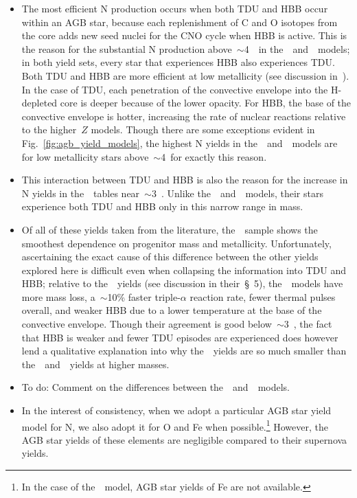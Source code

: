 \documentclass[ms.tex]{subfiles}
\begin{document}
\begin{itemize}
	\item The most efficient N production occurs when both TDU and HBB 
	occur within an AGB star, because each replenishment of C and O 
	isotopes from the core adds new seed nuclei for the CNO cycle when HBB 
	is active. 
	This is the reason for the substantial N production 
	above~$\sim$4~\msun~in the~\karakasten~and~\karakas~models; in both 
	yield sets, every star that experiences HBB also experiences TDU. 
	Both TDU and HBB are more efficient at low metallicity (see discussion 
	in~\ventura). 
	In the case of TDU, each penetration of the convective envelope into 
	the H-depleted core is deeper because of the lower opacity. 
	For HBB, the base of the convective envelope is hotter, increasing the 
	rate of nuclear reactions relative to the higher~$Z$ models. 
	Though there are some exceptions evident in Fig.~\ref{fig:agb_yield_models}, 
	the highest N yields in the~\karakasten~and~\karakas~models are for low 
	metallicity stars above~$\sim$4~\msun for exactly this reason. 

	\item This interaction between TDU and HBB is also the reason for the 
	increase in N yields in the~\ventura~tables near~$\sim$3~\msun. 
	Unlike the~\karakasten~and~\karakas~models, their stars experience 
	both TDU and HBB only in this narrow range in mass. 

	\item Of all of these yields taken from the literature, 
	the~\cristallo~sample shows the smoothest dependence on progenitor mass 
	and metallicity. 
	Unfortunately, ascertaining the exact cause of this difference between 
	the other yields explored here is difficult even when collapsing the 
	information into TDU and HBB; relative to the~\karakas~yields (see 
	discussion in their~\S~5), the~\cristallo~models have more mass loss, 
	a~$\sim$10\% faster triple-$\alpha$ reaction rate, fewer thermal pulses 
	overall, and weaker HBB due to a lower temperature at the base of the 
	convective envelope. 
	Though their agreement is good below~$\sim$3~\msun, the fact that 
	HBB is weaker and fewer TDU episodes are experienced does however lend 
	a qualitative explanation into why the~\cristallo~yields are so much 
	smaller than the~\karakasten~and~\karakas~yields at higher masses. 

	\item {\color{red} To do: Comment on the differences between 
	the~\karakasten~and~\karakas~models.} 

	\item In the interest of consistency, when we adopt a particular AGB star 
	yield model for N, we also adopt it for O and Fe when possible.\footnote{
		In the case of the~\ventura~model, AGB star yields of Fe are not 
		available. 
	} 
	However, the AGB star yields of these elements are negligible compared to 
	their supernova yields. 
\end{itemize} 
\end{document}
